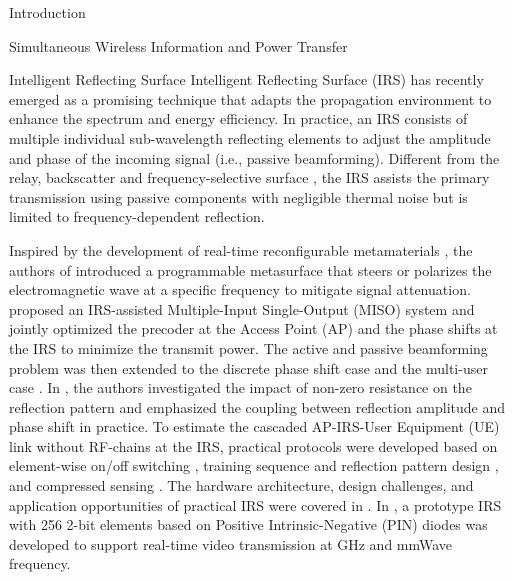 \documentclass[journal]{IEEEtran}
\begin{document}
\begin{section}{Introduction}
\begin{subsection}{Simultaneous Wireless Information and Power Transfer}
		\end{subsection}


		\begin{subsection}{Intelligent Reflecting Surface}
			Intelligent Reflecting Surface (IRS) has recently emerged as a promising technique that adapts the propagation environment to enhance the spectrum and energy efficiency. In practice, an IRS consists of multiple individual sub-wavelength reflecting elements to adjust the amplitude and phase of the incoming signal (i.e., passive beamforming). Different from the relay, backscatter and frequency-selective surface \cite{Anwar2018}, the IRS assists the primary transmission using passive components with negligible thermal noise but is limited to frequency-dependent reflection.

			Inspired by the development of real-time reconfigurable metamaterials \cite{Cui2014}, the authors of \cite{Liaskos2018} introduced a programmable metasurface that steers or polarizes the electromagnetic wave at a specific frequency to mitigate signal attenuation. \cite{Wu2018} proposed an IRS-assisted Multiple-Input Single-Output (MISO) system and jointly optimized the precoder at the Access Point (AP) and the phase shifts at the IRS to minimize the transmit power. The active and passive beamforming problem was then extended to the discrete phase shift case \cite{Wu2019a} and the multi-user case \cite{Wu2019}. In \cite{Abeywickrama2020}, the authors investigated the impact of non-zero resistance on the reflection pattern and emphasized the coupling between reflection amplitude and phase shift in practice. To estimate the cascaded AP-IRS-User Equipment (UE) link without RF-chains at the IRS, practical protocols were developed based on element-wise on/off switching \cite{Nadeem2019}, training sequence and reflection pattern design \cite{You2019,Kang2020}, and compressed sensing \cite{Wang2020}. The hardware architecture, design challenges, and application opportunities of practical IRS were covered in \cite{Wu2020}. In \cite{Dai2020}, a prototype IRS with \num{256} \num{2}-bit elements based on Positive Intrinsic-Negative (PIN) diodes was developed to support real-time video transmission at \si{GHz} and mmWave frequency.
		\end{subsection}



\end{section}
\end{document}
